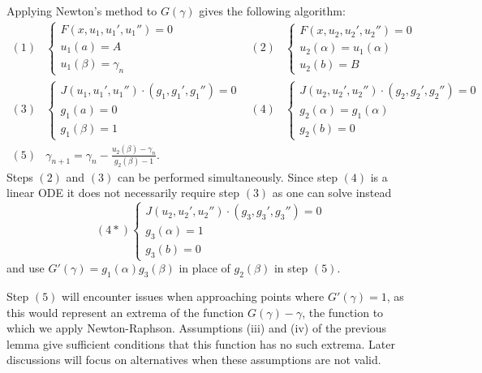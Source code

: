 \documentclass{book}
\begin{document}
Applying Newton's method to $G(\gamma)$ gives the following algorithm:
\begin{equation}
\begin{aligned} \label{alg:ASPN}
(1) & \begin{cases} F(x,u_1,u_1',u_1'') = 0 \\ u_1(a) = A \\ u_1(\beta) = \gamma_n \end{cases} &
(2) & \begin{cases} F(x,u_2,u_2',u_2'') = 0 \\ u_2(\alpha) = u_1(\alpha) \\ u_2(b) = B \end{cases} \\
(3) & \begin{cases} J(u_1,u_1',u_1'') \cdot (g_1,g_1',g_1'') = 0 \\ g_1(a) = 0 \\ g_1(\beta) = 1 \end{cases} &
(4) & \begin{cases} J(u_2,u_2',u_2'') \cdot (g_2,g_2',g_2'') = 0 \\ g_2(\alpha) = g_1(\alpha) \\ g_2(b) = 0 \end{cases} \\
(5) & \gamma_{n+1} = \gamma_n - \frac{ u_2(\beta) - \gamma_n }{g_2(\beta) - 1}. & &
\end{aligned}
\end{equation}
Steps $(2)$ and $(3)$ can be performed simultaneously.
Since step $(4)$ is a linear ODE it does not necessarily require step $(3)$ as one can solve instead
\begin{equation*}
(4*) \begin{cases} J(u_2,u_2',u_2'') \cdot (g_3,\textit{g}_3',\textit{g}_3'') = 0 \\
g_3(\alpha) = 1 \\ g_3(b) = 0 \end{cases}
\end{equation*}
and use $G'(\gamma) = g_1(\alpha) g_3(\beta)$ in place of $g_2(\beta)$ in step $(5)$.

Step $(5)$ will encounter issues when approaching points where $G'(\gamma) = 1$, as this would represent an extrema of the function $G(\gamma) - \gamma$, the function to which we apply Newton-Raphson.
Assumptions (iii) and (iv) of the previous lemma give sufficient conditions that this function has no such extrema.
Later discussions will focus on alternatives when these assumptions are not valid.
\end{document}
